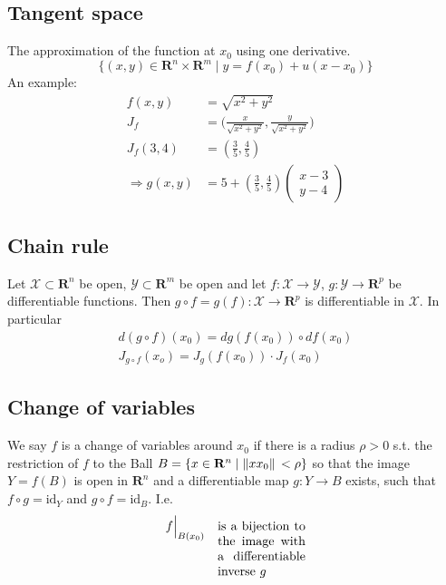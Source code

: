 \documentclass[8pt]{extarticle}
\newcommand{\R}{{\mathbb R}}
\newcommand{\X}{{\mathcal X}}
\newcommand{\ra}{{\rightarrow}}
\def\R{\mathbf{R}}
\begin{document}
\begin{multicols*}{3}
  \subsection{Tangent space}
  The approximation of the function at $x_0$ using one derivative.
  $$\{(x, y) \in \R^n \times \R^m \;|\; y = f(x_0) + u(x - x_0)\}$$
  An example:
  \begin{align*}
    f(x, y)             & = \sqrt{x^2 + y^2}                                                   \\
    J_f                 & = \Big( \frac{x}{\sqrt{x^2 + y^2}}, \frac{y}{\sqrt{x^2 + y^2}} \Big) \\
    J_f(3, 4)           & = (\frac{3}{5}, \frac{4}{5})                                         \\
    \Rightarrow g(x, y) & = 5 + (\frac{3}{5}, \frac{4}{5}) \begin{pmatrix}
      x-3 \\
      y-4
    \end{pmatrix}
  \end{align*}
  \subsection{Chain rule}
  Let $\X \subset \R^n$ be open,
  $\mathcal{Y} \subset \R^m$ be open and
  let $f: \X \ra \mathcal{Y}$, $g: \mathcal{Y} \ra \R^p$
  be differentiable functions. Then $g \circ f = g(f): \X \ra \R^p$
  is differentiable in $\X$. In particular
  \begin{align*}
    d(g \circ f)(x_0) = dg(f(x_0)) \circ df(x_0) \\
    J_{g \circ f}(x_o) = J_g(f(x_0)) \cdot J_f(x_0)
  \end{align*}
  \subsection{Change of variables}
  We say $f$ is a change of variables around
  $x_0$ if there is a radius $\rho > 0$ s.t. the restriction
  of $f$ to the Ball $B = \{x \in \R^n\;|\; \norm*{x  x_0} < \rho\}$
  so that the image $Y = f(B)$ is open in $\R^n$ and a differentiable
  map $g: Y \ra B$ exists, such that
  $f \circ g = \text{id}_Y$ and $g \circ f = \text{id}_B$.
  I.e.
  \begin{align*}
    f \Big |_{B(x_0)}
    \quad \parbox[t]{0.2\textwidth}{
      is a bijection to the image with
    a differentiable inverse $g$} \\
  \end{align*}

\end{multicols*}
\end{document}

